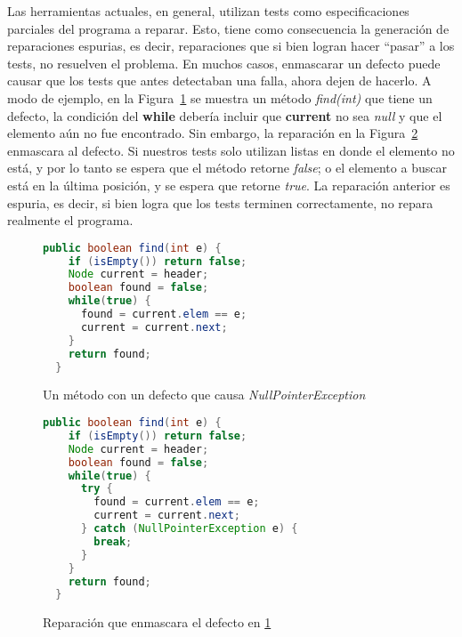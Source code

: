 Las herramientas actuales, en general, utilizan tests como especificaciones parciales del programa a reparar. Esto, tiene como consecuencia la generaci\'on de reparaciones espurias, es decir, reparaciones que si bien logran hacer ``pasar'' a los tests, no resuelven el problema. En muchos casos, enmascarar un defecto puede causar que los tests que antes detectaban una falla, ahora dejen de hacerlo. A modo de ejemplo, en la Figura~\ref{figures.examples.repair.nullaccessexample} se muestra un m\'etodo \emph{find(int)} que tiene un defecto, la condici\'on del \textbf{while} deber\'ia incluir que \textbf{current} no sea \emph{null} y que el elemento a\'un no fue encontrado. Sin embargo, la reparaci\'on en la Figura~\ref{figures.examples.repair.nullaccessexample.mask} enmascara al defecto. Si nuestros tests solo utilizan listas en donde el elemento no est\'a, y por lo tanto se espera que el m\'etodo retorne \emph{false}; o el elemento a buscar est\'a en la \'ultima posici\'on, y se espera que retorne \emph{true}. La reparaci\'on anterior es espuria, es decir, si bien logra que los tests terminen correctamente, no repara realmente el programa.

\begin{figure}
	\begin{lstlisting}[mathescape=true, language=Java]
  public boolean find(int e) {
    if (isEmpty()) return false;
    Node current = header;
    boolean found = false;
    while(true) {
      found = current.elem == e;
      current = current.next;
    }
    return found;
  }
	\end{lstlisting}
	\caption{Un m\'etodo con un defecto que causa \emph{NullPointerException}}
	\label{figures.examples.repair.nullaccessexample}
\end{figure}

\begin{figure}
	\begin{lstlisting}[mathescape=true, language=Java]
  public boolean find(int e) {
    if (isEmpty()) return false;
    Node current = header;
    boolean found = false;
    while(true) {
      try {
        found = current.elem == e;
        current = current.next;
      } catch (NullPointerException e) {
        break;
      }
    }
    return found;
  }
	\end{lstlisting}
	\caption{Reparaci\'on que enmascara el defecto en \ref{figures.examples.repair.nullaccessexample}}
	\label{figures.examples.repair.nullaccessexample.mask}
\end{figure}


